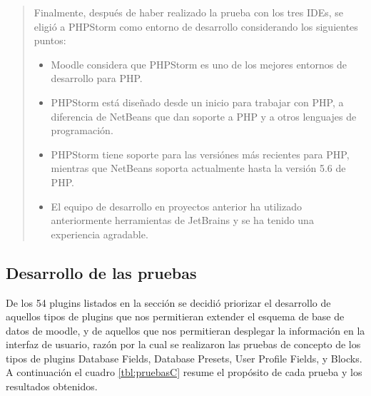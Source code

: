 
\begin{quote}
Finalmente, después de haber realizado la prueba con los  tres IDEs, se eligió a PHPStorm como entorno de desarrollo considerando los siguientes puntos:
    \begin{itemize}
    \item Moodle considera que PHPStorm es uno de los mejores entornos de desarrollo para PHP.
    \item PHPStorm está diseñado desde un inicio para trabajar con PHP, a diferencia de NetBeans que dan soporte a PHP y a otros lenguajes de programación.
    \item PHPStorm tiene soporte para las versiónes más recientes para PHP, mientras que NetBeans soporta actualmente hasta la versión 5.6 de PHP.
    \item El equipo de desarrollo en proyectos anterior ha utilizado anteriormente herramientas de JetBrains y se ha tenido una experiencia agradable. %
    \end{itemize}
\end{quote}

\subsection{Desarrollo de las pruebas}

    De los 54 plugins listados en la sección  se decidió priorizar el desarrollo de aquellos tipos de plugins que nos permitieran extender el esquema de base de datos de moodle, y de aquellos que nos permitieran desplegar la información en la interfaz de usuario, razón por la cual se realizaron las pruebas de concepto de los tipos de plugins Database Fields, Database Presets, User Profile Fields, y Blocks.\\

    \noindent A continuación el cuadro \ref{tbl:pruebasC} resume el propósito de cada prueba y los resultados obtenidos.

